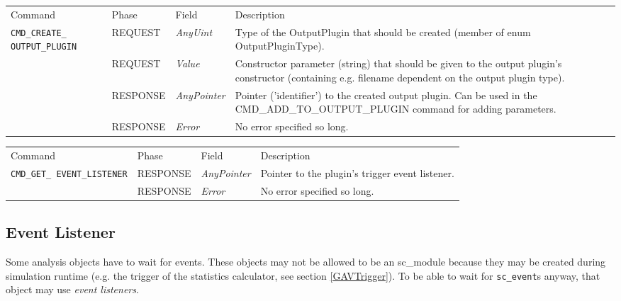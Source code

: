 \noindent
\begin{tabularx}{\textwidth}{|p{3.3cm}|p{2.3cm}|p{2cm}|X|}
	\cline{1-1}\cline{2-2}\cline{3-3}\cline{4-4} Command                &  Phase       &  Field             &  Description   \\ 
	\cline{1-1}\cline{2-2}\cline{3-3}\cline{4-4} \lstinline|CMD_CREATE_ OUTPUT_PLUGIN| &  REQUEST & {\em AnyUint}       &  
		Type of the OutputPlugin that should be created 
		(member of enum {\sffamily OutputPluginType}). \\ 
	\cline{1-1}\cline{2-2}\cline{3-3}\cline{4-4}                        &  REQUEST    &  {\em Value} & 
		Constructor parameter (string) that should be given to the output plugin's constructor 
		(containing e.g. filename dependent on the output plugin type). \\ 
	\cline{1-1}\cline{2-2}\cline{3-3}\cline{4-4}                        &  RESPONSE  &  {\em AnyPointer} & 
		Pointer ('identifier') to the created output plugin. Can be used in the 
		{\sffamily CMD\_ADD\_TO\_OUTPUT\_PLUGIN} command for adding parameters. \\ 
	\cline{1-1}\cline{2-2}\cline{3-3}\cline{4-4}                        &  RESPONSE  &  {\em Error}       &  
		No error specified so long.   \\ 
	\hline
\end{tabularx}

\vspace{1 cm}

\noindent
\begin{tabularx}{\textwidth}{|p{3.3cm}|p{2.3cm}|p{2cm}|X|}
	\cline{1-1}\cline{2-2}\cline{3-3}\cline{4-4} Command                &  Phase       &  Field             &  Description   \\ 
	\cline{1-1}\cline{2-2}\cline{3-3}\cline{4-4} \lstinline|CMD_GET_ EVENT_LISTENER| &  RESPONSE  &  {\em AnyPointer} &
		Pointer to the plugin's trigger event listener. \\ 
	\cline{1-1}\cline{2-2}\cline{3-3}\cline{4-4}                        &  RESPONSE  &  {\em Error}       &  
		No error specified so long.   \\ 
	\hline
\end{tabularx}


\subsection{Event Listener}
\label{GAVEventListener}

Some analysis objects have to wait for events. These objects may not be allowed to be an sc\_module because they may be created during simulation runtime (e.g. the trigger of the statistics calculator, see section \ref{GAVTrigger}). To be able to wait for \lstinline|sc_event|s anyway, that object may use {\em event listeners}.

